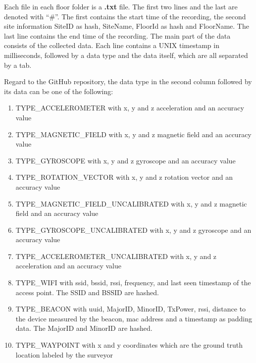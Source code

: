 Each file in each floor folder is a \textbf{.txt} file. 
The first two lines and the last are denoted with ``\#''.
The first contains the start time of the recording, the second site information SiteID as hash, SiteName, FloorId as hash and FloorName.
The last line contains the end time of the recording.
The main part of the data consists of the collected data. 
Each line contains a UNIX timestamp in milliseconds, followed by a data type and the data itself, which are all separated by a tab.

Regard to the GitHub repository\cite{GitHubComp}, the data type in the second column followed by its data can be one of the following:

\begin{enumerate}
    \item\label{type:acce} TYPE\_ACCELEROMETER with x, y and z acceleration and an accuracy value
    \item\label{type:mag} TYPE\_MAGNETIC\_FIELD with x, y and z magnetic field and an accuracy value
    \item\label{type:gyro} TYPE\_GYROSCOPE with x, y and z gyroscope and an accuracy value
    \item\label{type:rot} TYPE\_ROTATION\_VECTOR with x, y and z rotation vector and an accuracy value
    \item\label{type:mag_u} TYPE\_MAGNETIC\_FIELD\_UNCALIBRATED with x, y and z magnetic field and an accuracy value
    \item\label{type:gyro_u} TYPE\_GYROSCOPE\_UNCALIBRATED with x, y and z gyroscope and an accuracy value
    \item\label{type:acce_u} TYPE\_ACCELEROMETER\_UNCALIBRATED with x, y and z acceleration and an accuracy value
    \item\label{type:wifi} TYPE\_WIFI with \ac{ssid}, \ac{bssid}, \ac{rssi}, frequency, and last seen timestamp of the access point. The SSID and BSSID are hashed.
    \item\label{type:beacon} TYPE\_BEACON with \ac{uuid}, \ac{MajorID}, \ac{MinorID}, \ac{TxPower}, \ac{rssi}, distance to the device measured by the beacon, \ac{mac} address and a timestamp as padding data. The MajorID and MinorID are hashed.
    \item\label{type:way} TYPE\_WAYPOINT with x and y coordinates which are the ground truth location labeled by the surveyor
\end{enumerate}


